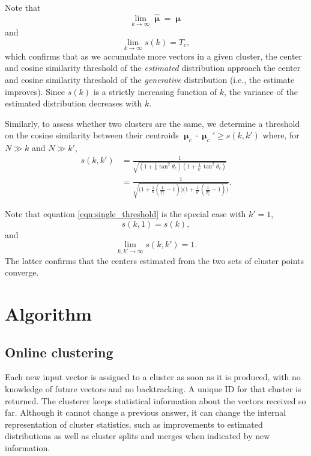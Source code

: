 \documentclass{article}
\begin{document}
Note that
\begin{equation}
\lim_{k\rightarrow\infty}\bm{\hat{\upmu}}=\bm{\upmu}
\end{equation}
and
\begin{equation}
\lim_{k\rightarrow\infty}s(k)=T_c,
\end{equation}
which confirms that as we accumulate more vectors in a given cluster, the center and cosine similarity threshold of the \textit{estimated} distribution approach the center and cosine similarity threshold of the \textit{generative} distribution (i.e., the estimate improves). Since $s(k)$ is a strictly increasing function of $k$, the variance of the estimated distribution decreases with $k$.

Similarly, to assess whether two clusters are the same, we determine a threshold on the cosine similarity between their centroids $\bm{\upmu}_c\cdot\bm{\upmu}_c'\geq s(k,k')$ where, for $N\gg k$ and $N\gg k'$,
\begin{equation}\label{eqn:multi_threshold}
\begin{split}
s(k,k') & =\frac{1}{\sqrt{\left( 1+\frac{1}{k}\tan^2\theta_c\right) \left( 1+\frac{1}{k'}\tan^2\theta_c\right)}} \\
& =\frac{1}{\sqrt{\bigg( 1+\frac{1}{k}\left(\frac{1}{T_c^2}-1\right)\bigg)\bigg(1+\frac{1}{k'}\left(\frac{1}{T_c^2}-1\right)\bigg)}}.
\end{split}
\end{equation}

Note that equation \ref{eqn:single_threshold} is the special case with $k'=1$,
\begin{equation}
s(k,1)=s(k),
\end{equation}
and
\begin{equation}\label{eqn:multi_limit}
\lim_{k,k'\rightarrow\infty}s(k,k')=1.
\end{equation}
The latter confirms that the centers estimated from the two sets of cluster points converge.

\section{Algorithm}
\label{sec:algorithm}

\subsection{Online clustering}
\label{sec:online}

Each new input vector is assigned to a cluster as soon as it is produced, with no knowledge of future vectors and no backtracking. A unique ID for that cluster is returned. The clusterer keeps statistical information about the vectors received so far.  Although it cannot change a previous answer, it can change the internal representation of cluster statistics, such as improvements to estimated distributions as well as cluster splits and merges when indicated by new information.
\end{document}
